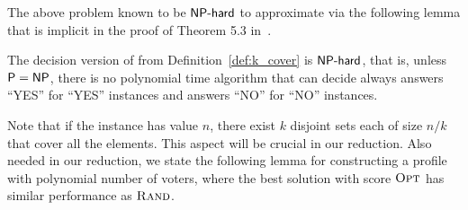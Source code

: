 

The above problem known to be $\mathsf{NP}\text{-}\mathsf{hard}$ to approximate via the following lemma that is implicit in the proof of Theorem 5.3 in~\cite{Feige}.

\begin{lemma}
The decision version of \rc{} from Definition~\ref{def:k_cover} is $\mathsf{NP}\text{-}\mathsf{hard}$, that is, unless $\mathsf{P} = \mathsf{NP}$, there is no polynomial time algorithm that can decide always answers ``YES'' for ``YES'' instances and answers ``NO'' for ``NO'' instances.
\label{lem:cited_hardness}
\end{lemma}

Note that if the instance has value $n$, there exist $k$ disjoint sets each of size $n/k$ that cover all the elements. This aspect will be crucial in our reduction. Also needed in our reduction, we state the following lemma for constructing a profile with polynomial number of voters, where the best solution with score ${\normalfont\textsc{Opt}}$ has similar performance as ${\normalfont\textsc{Rand}}$.

